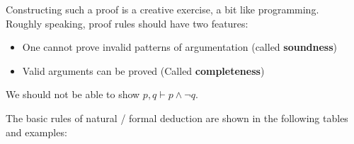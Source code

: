 \documentclass[english, 11pt]{article}
\begin{document}
    Constructing such a proof is a creative exercise, a bit like programming. \\

    Roughly speaking, proof rules should have two features:

    \begin{itemize}
      \item One cannot prove invalid patterns of argumentation (called \textbf{soundness})
      \item Valid arguments can be proved (Called \textbf{completeness})
    \end{itemize}

    \begin{exmp}
      We should not be able to show $p, q \vdash p \land \neg q$.
    \end{exmp}

    The basic rules of natural / formal deduction are shown in the following tables and examples:
\end{document}
